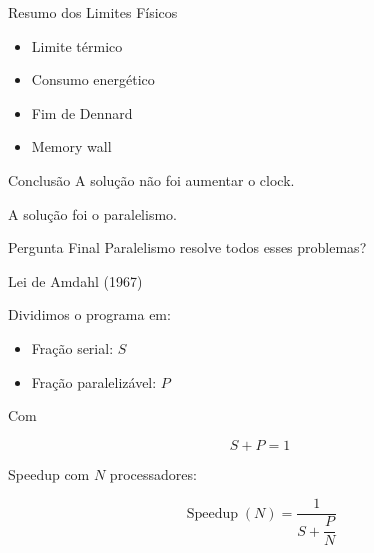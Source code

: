 \documentclass[aspectratio=169,11pt]{beamer}
\begin{document}
\begin{frame}{Resumo dos Limites Físicos}

    \begin{itemize}
        \item Limite térmico
        \item Consumo energético
        \item Fim de Dennard
        \item Memory wall
    \end{itemize}

    \vspace{0.30cm}

    \begin{impactbox}{Conclusão}
        A solução não foi aumentar o clock.

        A solução foi o paralelismo.
    \end{impactbox}

    \vspace{0.25cm}

    \begin{questionbox}{Pergunta Final}
        Paralelismo resolve todos esses problemas?
    \end{questionbox}

\end{frame}



\begin{frame}{Lei de Amdahl (1967)}

    Dividimos o programa em:

    \begin{itemize}
        \item Fração serial: $S$
        \item Fração paralelizável: $P$
    \end{itemize}

    Com

    \[
        S + P = 1
    \]

    Speedup com $N$ processadores:

    \[
        \operatorname{Speedup}(N)
        =
        \frac{1}{
            S + \dfrac{P}{N}
        }
    \]

\end{frame}


\end{document}
